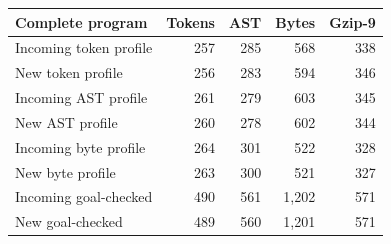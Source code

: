 \begin{tabular}{@{}lrrrr@{}}
\toprule
Complete program & Tokens & AST & Bytes & Gzip-9\\
\midrule
Incoming token profile & 257 & 285 & 568 & 338\\
New token profile & 256 & 283 & 594 & 346\\
Incoming AST profile & 261 & 279 & 603 & 345\\
New AST profile & 260 & 278 & 602 & 344\\
Incoming byte profile & 264 & 301 & 522 & 328\\
New byte profile & 263 & 300 & 521 & 327\\
Incoming goal-checked & 490 & 561 & 1,202 & 571\\
New goal-checked & 489 & 560 & 1,201 & 571\\
\bottomrule
\end{tabular}
